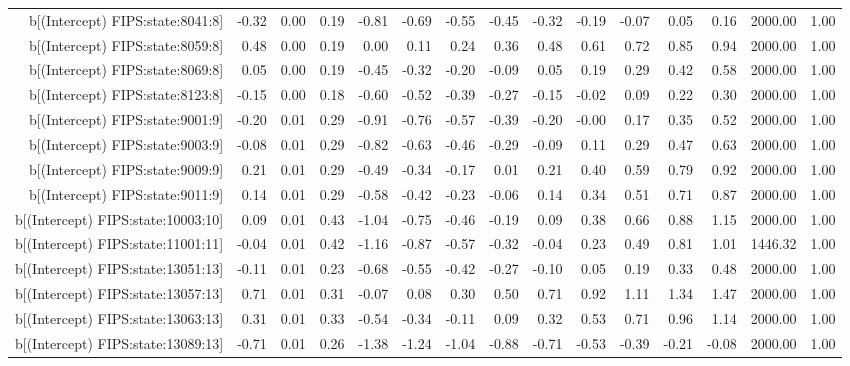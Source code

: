 \begin{table}[ht]
\begin{tabular}{rrrrrrrrrrrrrrr}
  b[(Intercept) FIPS:state:8041:8] & -0.32 & 0.00 & 0.19 & -0.81 & -0.69 & -0.55 & -0.45 & -0.32 & -0.19 & -0.07 & 0.05 & 0.16 & 2000.00 & 1.00 \\ 
  b[(Intercept) FIPS:state:8059:8] & 0.48 & 0.00 & 0.19 & 0.00 & 0.11 & 0.24 & 0.36 & 0.48 & 0.61 & 0.72 & 0.85 & 0.94 & 2000.00 & 1.00 \\ 
  b[(Intercept) FIPS:state:8069:8] & 0.05 & 0.00 & 0.19 & -0.45 & -0.32 & -0.20 & -0.09 & 0.05 & 0.19 & 0.29 & 0.42 & 0.58 & 2000.00 & 1.00 \\ 
  b[(Intercept) FIPS:state:8123:8] & -0.15 & 0.00 & 0.18 & -0.60 & -0.52 & -0.39 & -0.27 & -0.15 & -0.02 & 0.09 & 0.22 & 0.30 & 2000.00 & 1.00 \\ 
  b[(Intercept) FIPS:state:9001:9] & -0.20 & 0.01 & 0.29 & -0.91 & -0.76 & -0.57 & -0.39 & -0.20 & -0.00 & 0.17 & 0.35 & 0.52 & 2000.00 & 1.00 \\ 
  b[(Intercept) FIPS:state:9003:9] & -0.08 & 0.01 & 0.29 & -0.82 & -0.63 & -0.46 & -0.29 & -0.09 & 0.11 & 0.29 & 0.47 & 0.63 & 2000.00 & 1.00 \\ 
  b[(Intercept) FIPS:state:9009:9] & 0.21 & 0.01 & 0.29 & -0.49 & -0.34 & -0.17 & 0.01 & 0.21 & 0.40 & 0.59 & 0.79 & 0.92 & 2000.00 & 1.00 \\ 
  b[(Intercept) FIPS:state:9011:9] & 0.14 & 0.01 & 0.29 & -0.58 & -0.42 & -0.23 & -0.06 & 0.14 & 0.34 & 0.51 & 0.71 & 0.87 & 2000.00 & 1.00 \\ 
  b[(Intercept) FIPS:state:10003:10] & 0.09 & 0.01 & 0.43 & -1.04 & -0.75 & -0.46 & -0.19 & 0.09 & 0.38 & 0.66 & 0.88 & 1.15 & 2000.00 & 1.00 \\ 
  b[(Intercept) FIPS:state:11001:11] & -0.04 & 0.01 & 0.42 & -1.16 & -0.87 & -0.57 & -0.32 & -0.04 & 0.23 & 0.49 & 0.81 & 1.01 & 1446.32 & 1.00 \\ 
  b[(Intercept) FIPS:state:13051:13] & -0.11 & 0.01 & 0.23 & -0.68 & -0.55 & -0.42 & -0.27 & -0.10 & 0.05 & 0.19 & 0.33 & 0.48 & 2000.00 & 1.00 \\ 
  b[(Intercept) FIPS:state:13057:13] & 0.71 & 0.01 & 0.31 & -0.07 & 0.08 & 0.30 & 0.50 & 0.71 & 0.92 & 1.11 & 1.34 & 1.47 & 2000.00 & 1.00 \\ 
  b[(Intercept) FIPS:state:13063:13] & 0.31 & 0.01 & 0.33 & -0.54 & -0.34 & -0.11 & 0.09 & 0.32 & 0.53 & 0.71 & 0.96 & 1.14 & 2000.00 & 1.00 \\ 
  b[(Intercept) FIPS:state:13089:13] & -0.71 & 0.01 & 0.26 & -1.38 & -1.24 & -1.04 & -0.88 & -0.71 & -0.53 & -0.39 & -0.21 & -0.08 & 2000.00 & 1.00 \\ 

\end{tabular}
\end{table}
